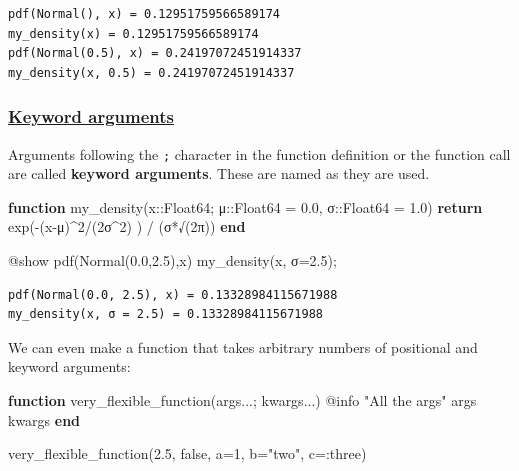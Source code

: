\documentclass[
]{article}
\newenvironment{Shaded}{\begin{snugshade}}{\end{snugshade}}
\newcommand{\ConstantTok}[1]{\textcolor[rgb]{0.56,0.35,0.01}{#1}}
\newcommand{\ControlFlowTok}[1]{\textcolor[rgb]{0.00,0.23,0.31}{\textbf{#1}}}
\newcommand{\DataTypeTok}[1]{\textcolor[rgb]{0.68,0.00,0.00}{#1}}
\newcommand{\FloatTok}[1]{\textcolor[rgb]{0.68,0.00,0.00}{#1}}
\newcommand{\FunctionTok}[1]{\textcolor[rgb]{0.28,0.35,0.67}{#1}}
\newcommand{\KeywordTok}[1]{\textcolor[rgb]{0.00,0.23,0.31}{\textbf{#1}}}
\newcommand{\NormalTok}[1]{\textcolor[rgb]{0.00,0.23,0.31}{#1}}
\newcommand{\OperatorTok}[1]{\textcolor[rgb]{0.37,0.37,0.37}{#1}}
\newcommand{\PreprocessorTok}[1]{\textcolor[rgb]{0.68,0.00,0.00}{#1}}
\newcommand{\StringTok}[1]{\textcolor[rgb]{0.13,0.47,0.30}{#1}}
\begin{document}
\begin{verbatim}
pdf(Normal(), x) = 0.12951759566589174
my_density(x) = 0.12951759566589174
pdf(Normal(0.5), x) = 0.24197072451914337
my_density(x, 0.5) = 0.24197072451914337
\end{verbatim}

\subsubsection{\texorpdfstring{\href{https://docs.julialang.org/en/v1/manual/functions/\#Keyword-Arguments}{Keyword
arguments}}{Keyword arguments}}\label{keyword-arguments}

Arguments following the \texttt{;} character in the function definition
or the function call are called \textbf{keyword arguments}. These are
named as they are used.

\begin{Shaded}
\begin{Highlighting}[]
\KeywordTok{function} \FunctionTok{my\_density}\NormalTok{(x}\OperatorTok{::}\DataTypeTok{Float64}\NormalTok{; μ}\OperatorTok{::}\DataTypeTok{Float64 }\OperatorTok{=} \FloatTok{0.0}\NormalTok{, σ}\OperatorTok{::}\DataTypeTok{Float64 }\OperatorTok{=} \FloatTok{1.0}\NormalTok{)}
   \ControlFlowTok{return} \FunctionTok{exp}\NormalTok{(}\FunctionTok{{-}}\NormalTok{(x}\OperatorTok{{-}}\NormalTok{μ)}\OperatorTok{\^{}}\FloatTok{2}\OperatorTok{/}\NormalTok{(}\FloatTok{2}\NormalTok{σ}\OperatorTok{\^{}}\FloatTok{2}\NormalTok{) ) }\OperatorTok{/}\NormalTok{ (}\FunctionTok{σ*√}\NormalTok{(}\FloatTok{2}\NormalTok{π)) }
\KeywordTok{end}

\PreprocessorTok{@show} \FunctionTok{pdf}\NormalTok{(}\FunctionTok{Normal}\NormalTok{(}\FloatTok{0.0}\NormalTok{,}\FloatTok{2.5}\NormalTok{),x) }\FunctionTok{my\_density}\NormalTok{(x, σ}\OperatorTok{=}\FloatTok{2.5}\NormalTok{);}
\end{Highlighting}
\end{Shaded}

\begin{verbatim}
pdf(Normal(0.0, 2.5), x) = 0.13328984115671988
my_density(x, σ = 2.5) = 0.13328984115671988
\end{verbatim}

We can even make a function that takes arbitrary numbers of positional
and keyword arguments:

\begin{Shaded}
\begin{Highlighting}[]
\KeywordTok{function} \FunctionTok{very\_flexible\_function}\NormalTok{(args}\OperatorTok{...}\NormalTok{; kwargs}\OperatorTok{...}\NormalTok{)}
   \PreprocessorTok{@info} \StringTok{"All the args"}\NormalTok{ args kwargs}
\KeywordTok{end}

\FunctionTok{very\_flexible\_function}\NormalTok{(}\FloatTok{2.5}\NormalTok{, }\ConstantTok{false}\NormalTok{, a}\OperatorTok{=}\FloatTok{1}\NormalTok{, b}\OperatorTok{=}\StringTok{"two"}\NormalTok{, c}\OperatorTok{=:}\NormalTok{three)}
\end{Highlighting}
\end{Shaded}
\end{document}
